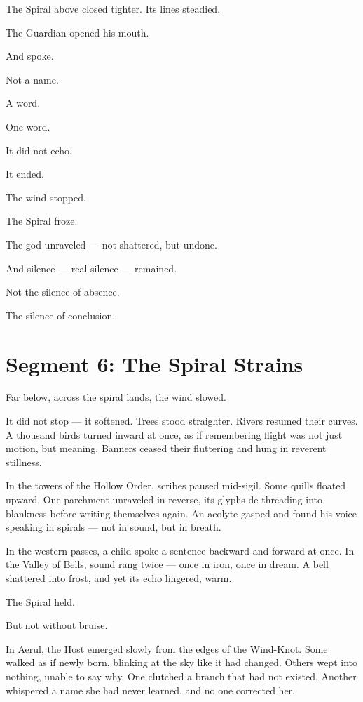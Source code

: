 \documentclass[9pt]{article}
\begin{document}
The Spiral above closed tighter. Its lines steadied.

The Guardian opened his mouth.

And spoke.

Not a name.

A word.

One word.

It did not echo.

It ended.

The wind stopped.

The Spiral froze.

The god unraveled — not shattered, but undone.

And silence — real silence — remained.

Not the silence of absence.

The silence of conclusion.

\newpage

\section*{Segment 6: The Spiral Strains}

Far below, across the spiral lands, the wind slowed.

It did not stop — it softened. Trees stood straighter. Rivers resumed their curves. A thousand birds turned inward at once, as if remembering flight was not just motion, but meaning. Banners ceased their fluttering and hung in reverent stillness.

In the towers of the Hollow Order, scribes paused mid-sigil. Some quills floated upward. One parchment unraveled in reverse, its glyphs de-threading into blankness before writing themselves again. An acolyte gasped and found his voice speaking in spirals — not in sound, but in breath.

In the western passes, a child spoke a sentence backward and forward at once. In the Valley of Bells, sound rang twice — once in iron, once in dream. A bell shattered into frost, and yet its echo lingered, warm.

The Spiral held.

But not without bruise.

In Aerul, the Host emerged slowly from the edges of the Wind-Knot. Some walked as if newly born, blinking at the sky like it had changed. Others wept into nothing, unable to say why. One clutched a branch that had not existed. Another whispered a name she had never learned, and no one corrected her.
\end{document}

